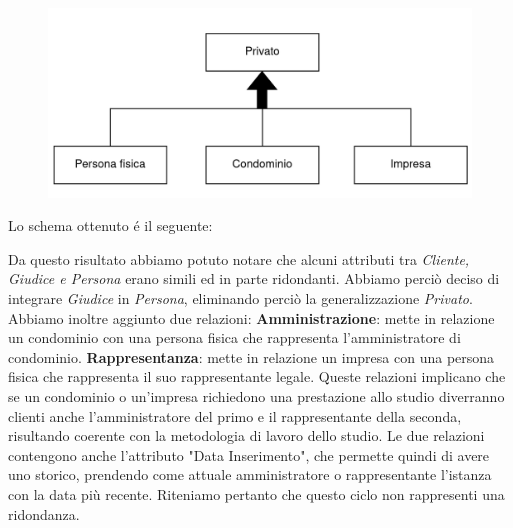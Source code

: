 \documentclass{elegantbook}
\begin{document}
            \begin{figure}[H]
                \includegraphics[scale=0.4]{../Img/DBSchemes/cliente-2.png}
            \end{figure}
        
            \newpage
            Lo schema ottenuto é il seguente:

            \begin{figure}[H]
            \end{figure}

            Da questo risultato abbiamo potuto notare che alcuni attributi tra \textit{Cliente, Giudice e Persona} erano simili ed in parte ridondanti. Abbiamo perciò deciso di integrare \textit{Giudice} in \textit{Persona},
            eliminando perciò la generalizzazione \textit{Privato}.
            Abbiamo inoltre aggiunto due relazioni:
            \textbf{Amministrazione}: mette in relazione un condominio con una persona fisica che rappresenta l'amministratore di condominio.
            \textbf{Rappresentanza}: mette in relazione un impresa con una persona fisica che rappresenta il suo rappresentante legale.
            Queste relazioni implicano che se un condominio o un'impresa richiedono una prestazione allo studio diverranno clienti anche l'amministratore del primo e il rappresentante della seconda, risultando coerente con la metodologia di lavoro dello studio.
            Le due relazioni contengono anche l'attributo "Data Inserimento", che permette quindi di avere uno storico, prendendo come attuale amministratore o rappresentante l'istanza con la data più recente. Riteniamo pertanto che questo ciclo non rappresenti una ridondanza.
\end{document}
